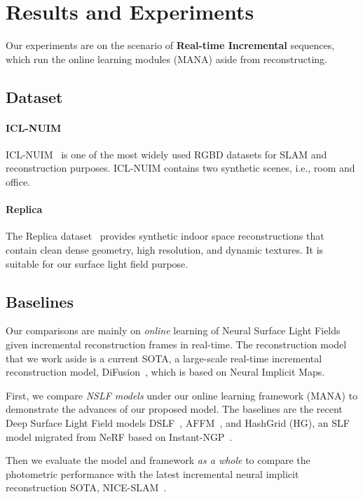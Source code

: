 \section{Results and Experiments}

Our experiments are on the scenario of \textbf{Real-time Incremental} sequences, which run the online learning modules (MANA) aside from reconstructing.

\subsection{Dataset}
\paragraph{ICL-NUIM}
%
ICL-NUIM~\cite{handa2014benchmark} is one of the most widely used RGBD datasets for SLAM and reconstruction purposes.
ICL-NUIM contains two synthetic scenes, i.e., room and office. 

\paragraph{Replica}
%
The Replica dataset~\cite{straub2019replica} provides synthetic indoor space reconstructions that contain clean dense geometry, high resolution, and dynamic textures.
It is suitable for our surface light field purpose.

\subsection{Baselines}

Our comparisons are mainly on \emph{online} learning of Neural Surface Light Fields given incremental reconstruction frames in real-time.
The reconstruction model that we work aside is a current SOTA, a large-scale real-time incremental reconstruction model, DiFusion~\cite{huang2021di}, which is based on Neural Implicit Maps.

First, we compare \emph{NSLF models} under our online learning framework (MANA) to demonstrate the advances of our proposed model.
The baselines are the recent Deep Surface Light Field models DSLF~\cite{chen2018deep}, AFFM~\cite{yu2022anisotropic}, and HashGrid (HG), an SLF model migrated from NeRF based on Instant-NGP~\cite{muller2022instant}.

Then we evaluate the model and framework \emph{as a whole} to compare the photometric performance with the latest incremental neural implicit reconstruction SOTA, NICE-SLAM~\cite{zhu2022nice}.


